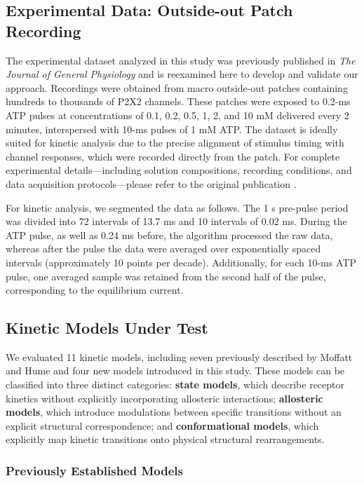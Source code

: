 \documentclass[9pt]{elife}
\begin{document}
	
	\subsection{Experimental Data: Outside-out Patch Recording}
	
	The experimental dataset analyzed in this study was previously published in \textit{The Journal of General Physiology} \cite{Moffatt_hume} and is reexamined here to develop and validate our approach. Recordings were obtained from macro outside-out patches containing hundreds to thousands of P2X2 channels. These patches were exposed to 0.2-ms ATP pulses at concentrations of 0.1, 0.2, 0.5, 1, 2, and 10 mM delivered every 2 minutes, interspersed with 10-ms pulses of 1 mM ATP. The dataset is ideally suited for kinetic analysis due to the precise alignment of stimulus timing with channel responses, which were recorded directly from the patch. For complete experimental details—including solution compositions, recording conditions, and data acquisition protocols—please refer to the original publication \cite{Moffatt_hume}.
	
	For kinetic analysis, we segmented the data as follows. The 1 s pre-pulse period was divided into 72 intervals of 13.7 ms and 10 intervals of 0.02 ms. During the ATP pulse, as well as 0.24 ms before,  the algorithm processed the raw data, whereas after the pulse the data were averaged over exponentially spaced intervals (approximately 10 points per decade). Additionally, for each 10-ms ATP pulse, one averaged sample  was retained from the second half of the pulse, corresponding to the equilibrium current. 
	
	\subsection{Kinetic Models Under Test}
	
	We evaluated 11 kinetic models, including seven previously described by Moffatt and Hume \cite{Moffatt_hume} and four new models introduced in this study. These models can be classified  into three distinct categories: \textbf{state models}, which describe receptor kinetics without explicitly incorporating allosteric interactions; \textbf{allosteric models}, which introduce modulations between specific transitions without an explicit structural correspondence; and \textbf{conformational models}, which explicitly map kinetic transitions onto physical structural rearrangements.
	
	\subsubsection{Previously Established Models}
	
\end{document}
